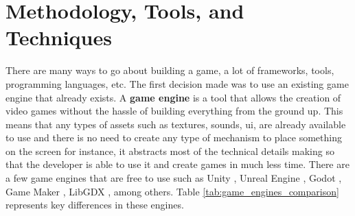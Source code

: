 
\section{Methodology, Tools, and Techniques}
\label{methodology}
There are many ways to go about building a game, a lot of frameworks, tools, programming languages, etc. The first decision made was to use an existing game engine that already exists. A \textbf{game engine} is a tool that allows the creation of video games without the hassle of building everything from the ground up. This means that any types of assets such as textures, sounds, \gls{ui}, are already available to use and there is no need to create any type of mechanism to place something on the screen for instance, it abstracts most of the technical details making so that the developer is able to use it and create games in much less time. There are a few game engines that are free to use such as Unity \cite{unity}, Unreal Engine \cite{unrealengine}, Godot \cite{godot}, Game Maker \cite{gamemaker}, LibGDX \cite{libgdx}, among others. Table \ref{tab:game_engines_comparison} represents key differences in these engines.

